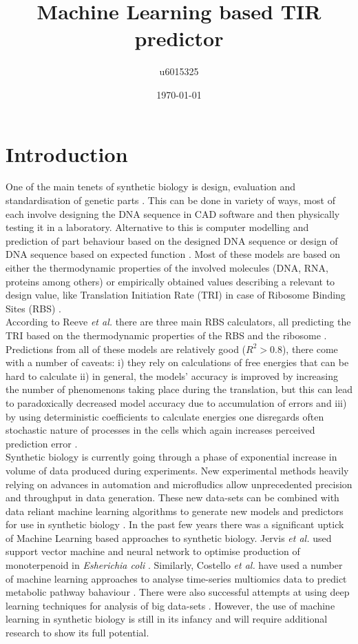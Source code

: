 \documentclass{article}
\title{Machine Learning based TIR predictor}
\author{u6015325 }
\date{\today{}}
\begin{document}
\maketitle

\section{Introduction}

One of the main tenets of synthetic biology is design, evaluation and standardisation of genetic parts \cite{Brophy2014,Canton2008,Stanton2014}. This can be done in variety of ways, most of each involve designing the DNA sequence in CAD software and then physically testing it in a laboratory. Alternative to this is computer modelling and prediction of part behaviour based on the designed DNA sequence or design of DNA sequence based on expected function \cite{Yeoh2019,Nielsen2016}. Most of these models are based on either the thermodynamic properties of the involved molecules (DNA, RNA, proteins among others) or empirically obtained values describing a relevant to design value, like Translation Initiation Rate (TRI) in case of Ribosome Binding Sites (RBS) \cite{Xia1998,Chen2013,Reeve2014}.\\
According to Reeve \emph{et al.} there are three main RBS calculators, all predicting the TRI based on the thermodynamic properties of the RBS and the ribosome \cite{Seo2013,Na2010,Salis2009}. Predictions from all of these models are relatively good ($R^2 >0.8$), there come with a number of caveats: i) they rely on calculations of free energies that can be hard to calculate ii) in general, the models' accuracy is improved by increasing the number of phenomenons taking place during the translation, but this can lead to paradoxically decreased model accuracy due to accumulation of errors \cite{EspahBorujeni2016} and iii) by using deterministic coefficients to calculate energies one disregards often stochastic nature of processes in the cells which again increases perceived prediction error \cite{Goss1998}. \\
Synthetic biology is currently going through a phase of exponential increase in volume of data produced during experiments. \cite{Freemont2019} New experimental methods heavily relying on advances in automation and microfludics allow unprecedented precision and throughput in data generation. These new data-sets can be combined with data reliant machine learning algorithms to generate new models and predictors for use in synthetic biology \cite{Camacho2018}. In the past few years there was a significant uptick of Machine Learning based approaches to synthetic biology. Jervis \emph{et al.} used support vector machine and neural network to optimise production of monoterpenoid in \emph{Esherichia coli} \cite{Jervis2019}. Similarly, Costello \emph{et al.} have used a number of machine learning approaches to analyse time-series multiomics data to predict metabolic pathway bahaviour \cite{Costello2018}. There were also successful attempts at using deep learning techniques for analysis of big data-sets \cite{Alipanahi2015,Angermueller2016}. However, the use of machine learning in synthetic biology is still in its infancy and will require additional research to show its full potential. \\
\end{document}
